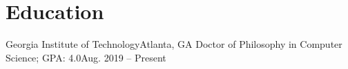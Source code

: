 \section{Education}
  \resumeSubHeadingListStart
    \resumeSubheading
      {Georgia Institute of Technology}{Atlanta, GA}
      {Doctor of Philosophy in Computer Science;  GPA: 4.0}{Aug. 2019 -- Present}
  \resumeSubHeadingListEnd
